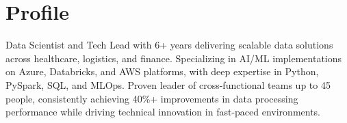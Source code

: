 \section*{Profile}
\noindent
Data Scientist and Tech Lead with 6+ years delivering scalable data solutions across healthcare, logistics, and finance. Specializing in AI/ML implementations on Azure, Databricks, and AWS platforms, with deep expertise in Python, PySpark, SQL, and MLOps. Proven leader of cross-functional teams up to 45 people, consistently achieving 40\%+ improvements in data processing performance while driving technical innovation in fast-paced environments.